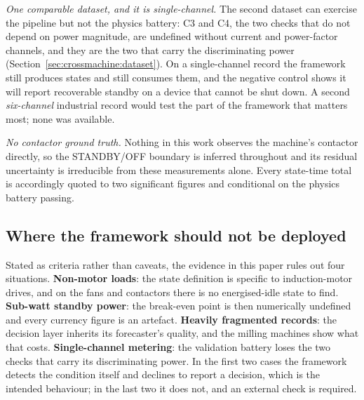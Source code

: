 \emph{One comparable dataset, and it is single-channel.} The second
dataset can exercise the pipeline but not the physics battery: C3 and
C4, the two checks that do not depend on power magnitude, are undefined
without current and power-factor channels, and they are the two that
carry the discriminating power
(Section~\ref{sec:crossmachine:dataset}).
On a single-channel record the framework still produces states and still
consumes them, and the negative control shows it will report recoverable
standby on a device that cannot be shut down. A second \emph{six-channel}
industrial record would test the part of the framework that matters
most; none was available.

\emph{No contactor ground truth.} Nothing in this work observes the
machine's contactor directly, so the STANDBY/OFF boundary is inferred
throughout and its residual uncertainty is irreducible from these
measurements alone. Every state-time total is accordingly quoted to two
significant figures and conditional on the physics battery passing.

\subsection{Where the framework should not be deployed}
\label{sec:limitations:deploy}

Stated as criteria rather than caveats, the evidence in this paper rules
out four situations. \textbf{Non-motor loads}: the state definition is
specific to induction-motor drives, and on the fans and contactors there
is no energised-idle state to find. \textbf{Sub-watt standby power}: the
break-even point is then numerically undefined and every currency figure
is an artefact. \textbf{Heavily fragmented records}: the decision layer
inherits its forecaster's quality, and the milling machines show what
that costs. \textbf{Single-channel metering}: the validation battery
loses the two checks that carry its discriminating power. In the first
two cases the framework detects the condition itself and declines to
report a decision, which is the intended behaviour; in the last two it
does not, and an external check is required.
